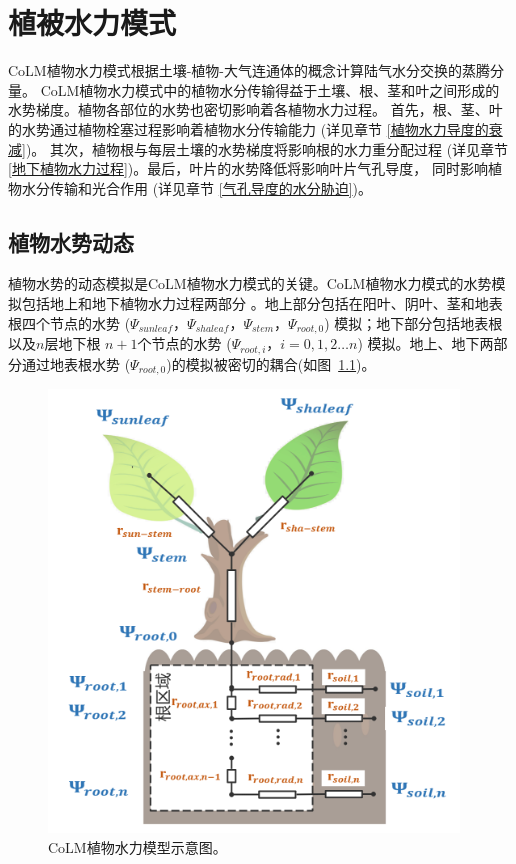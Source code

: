 \chapter{植被水力模式}

CoLM植物水力模式根据土壤-植物-大气连通体的概念计算陆气水分交换的蒸腾分量。
CoLM植物水力模式中的植物水分传输得益于土壤、根、茎和叶之间形成的水势梯度。植物各部位的水势也密切影响着各植物水力过程。
首先，根、茎、叶的水势通过植物栓塞过程影响着植物水分传输能力 (详见章节 \ref{植物水力导度的衰减})。
其次，植物根与每层土壤的水势梯度将影响根的水力重分配过程 (详见章节 \ref{地下植物水力过程})。最后，叶片的水势降低将影响叶片气孔导度，
同时影响植物水分传输和光合作用 (详见章节 \ref{气孔导度的水分胁迫})。
\section{植物水势动态}\label{植物水势动态}
植物水势的动态模拟是CoLM植物水力模式的关键。CoLM植物水力模式的水势模拟包括地上和地下植物水力过程两部分
。地上部分包括在阳叶、阴叶、茎和地表根四个节点的水势 ($\Psi_{sunleaf}$，$\Psi_{shaleaf}$，$\Psi_{stem}$，$\Psi_{root,0}$)
 模拟；地下部分包括地表根以及$n$层地下根 $n+1$个节点的水势 ($\Psi_{root,i}$，$i=0,1,2{\ldots}n$) 模拟。地上、地下两部分通过地表根水势
 ($\Psi_{root,0}$)的模拟被密切的耦合(如图~\ref{fig:CoLM植物水力模型示意图})。
 {
\begin{figure}[]
\centering
\includegraphics{Figures/植被水力模式/CoLM植物水力模型示意图.png}
\caption{CoLM植物水力模型示意图。}
\label{fig:CoLM植物水力模型示意图}
\end{figure}
}



